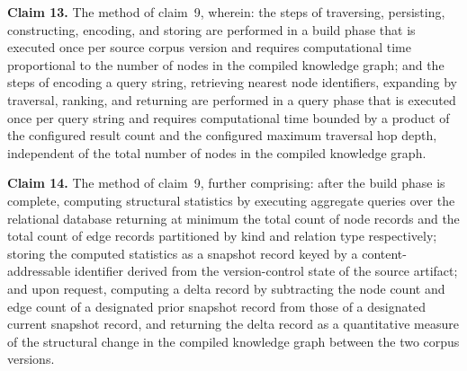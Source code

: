 \documentclass[12pt]{article}
\begin{document}
\bigskip
\noindent\textbf{Claim 13.}\quad
The method of claim~9, wherein: the steps of traversing, persisting,
constructing, encoding, and storing are performed in a build phase that is
executed once per source corpus version and requires computational time
proportional to the number of nodes in the compiled knowledge graph; and the
steps of encoding a query string, retrieving nearest node identifiers, expanding
by traversal, ranking, and returning are performed in a query phase that is
executed once per query string and requires computational time bounded by a
product of the configured result count and the configured maximum traversal hop
depth, independent of the total number of nodes in the compiled knowledge graph.

\bigskip
\noindent\textbf{Claim 14.}\quad
The method of claim~9, further comprising: after the build phase is complete,
computing structural statistics by executing aggregate queries over the relational
database returning at minimum the total count of node records and the total count
of edge records partitioned by kind and relation type respectively; storing the
computed statistics as a snapshot record keyed by a content-addressable
identifier derived from the version-control state of the source artifact; and
upon request, computing a delta record by subtracting the node count and edge
count of a designated prior snapshot record from those of a designated current
snapshot record, and returning the delta record as a quantitative measure of the
structural change in the compiled knowledge graph between the two corpus versions.
\end{document}
